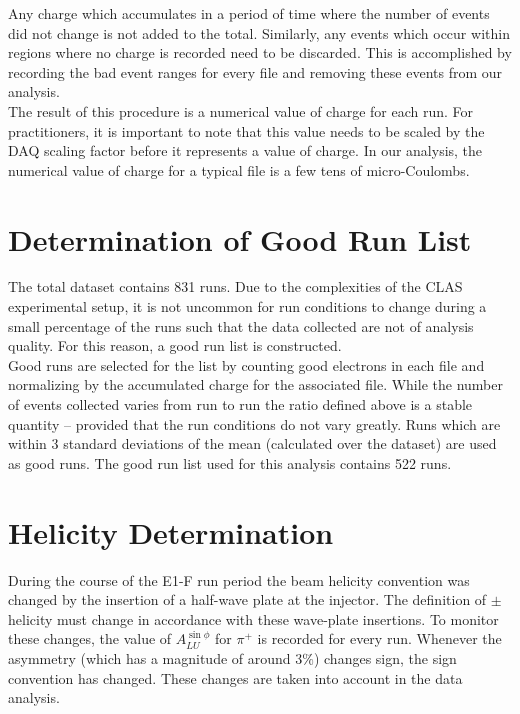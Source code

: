 Any charge which accumulates in a period of time where the number of events did not change is not added to the total.  Similarly, any events which occur within regions where no charge is recorded need to be discarded.  This is accomplished by recording the bad event ranges for every file and removing these events from our analysis. \\

The result of this procedure is a numerical value of charge for each run.  For practitioners, it is important to note that this value needs to be scaled by the DAQ scaling factor before it represents a value of charge.  In our analysis, the numerical value of charge for a typical file is a few tens of micro-Coulombs.

\section{Determination of Good Run List}
The total dataset contains 831 runs.  Due to the complexities of the CLAS experimental setup, it is not uncommon for run conditions to change during a small percentage of the runs such that the data collected are not of analysis quality.  For this reason, a good run list is constructed. \\

Good runs are selected for the list by counting good electrons in each file and normalizing by the accumulated charge for the associated file.  While the number of events collected varies from run to run the ratio defined above is a stable quantity -- provided that the run conditions do not vary greatly.  Runs which are within 3 standard deviations of the mean (calculated over the dataset) are used as good runs.  The good run list used for this analysis contains 522 runs.  


\section{Helicity Determination}
During the course of the E1-F run period the beam helicity convention was changed by the insertion of a half-wave plate at the injector.  The definition of $\pm$ helicity must change in accordance with these wave-plate insertions.  To monitor these changes, the value of $A_{LU}^{\sin\phi}$ for $\pi^+$ is recorded for every run.  Whenever the asymmetry (which has a magnitude of around $3\%$) changes sign, the sign convention has changed.  These changes are taken into account in the data analysis.   

